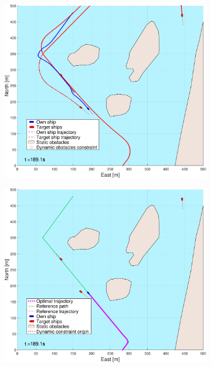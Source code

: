 \begin{figure}[ht]
\begin{subfigure}[b]{0.494\textwidth}
        \subcaption{}
    \end{subfigure}
    \hfill
    \\
    \begin{subfigure}[b]{0.494\textwidth}
        \centering
        \includegraphics[width=\textwidth]{Images/NewFigures/Helloya_Rev/_Simple_0fig1_time=190}
        \subcaption{}
    \end{subfigure}
    \hfill
    \begin{subfigure}[b]{0.494\textwidth}
        \centering
        \includegraphics[width=\textwidth]{Images/NewFigures/Helloya_Rev/_Simple_0fig999_time=190}

\end{subfigure}
\end{figure}
